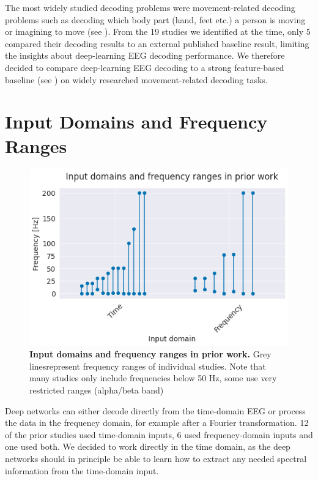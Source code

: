    The most widely studied decoding problems were movement-related decoding
problems such as decoding which body part (hand, feet etc.) a person is
moving or imagining to move (see
). From the 19 studies we
identified at the time, only 5 compared their decoding results to an
external published baseline result, limiting the insights about
deep-learning EEG decoding performance. We therefore decided to compare
deep-learning EEG decoding to a strong feature-based baseline (see
) on widely researched
movement-related decoding tasks.

\section{Input Domains and Frequency
Ranges}\label{input-domains-and-frequency-ranges}


\begin{figure}[ht]
    \myfloatalign
    \includegraphics[width=1\linewidth]{latex_images/PriorWork_files/PriorWork_7_0.png}
    \caption[Input domains and frequency ranges in prior work.]{\textbf{Input domains and frequency ranges in prior work.} Grey linesrepresent frequency ranges of individual studies. Note that many studies
only include frequencies below 50 Hz, some use very restricted ranges
(alpha/beta band)}\label{input_domain_fig}
\end{figure}
    

    Deep networks can either decode directly from the time-domain EEG or
process the data in the frequency domain, for example after a Fourier
transformation. 12 of the prior studies used time-domain inputs, 6 used
frequency-domain inputs and one used both. We decided to work directly
in the time domain, as the deep networks should in principle be able to
learn how to extract any needed spectral information from the
time-domain input.

